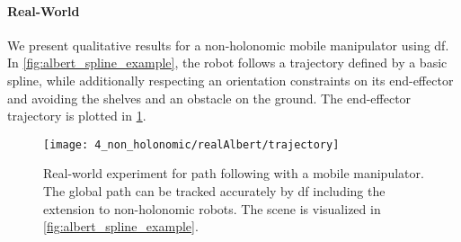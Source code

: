 \paragraph{Real-World}
We present qualitative results for a non\hyp{}holonomic mobile manipulator using \ac{df}.
In \cref{fig:albert_spline_example}, the robot follows a trajectory defined by a basic spline,
while additionally respecting an orientation constraints on its end-effector and avoiding
the shelves and an obstacle on the ground. The end-effector trajectory is plotted in \cref{fig:albert_spline_trajectory}.
%
\begin{figure}[t!]
    \centering
    \texttt{[image: 4\_non\_holonomic/realAlbert/trajectory]}
    \caption{Real-world experiment for path following with a mobile manipulator. The global path can be tracked
        accurately by \ac{df} including the extension to non\hyp{}holonomic robots. The scene 
        is visualized in \cref{fig:albert_spline_example}.}
    \label{fig:albert_spline_trajectory}
\end{figure}
%
\iffalse
%
\begin{figure}[ht]
  \centering
  \texttt{[image: 4\_non\_holonomic/realAlbert/motion\_in\_frame]}
  \caption{Trajectory following with mobile manipulator. \MS{This needs to be redone \ldots}}%
  \label{fig:albert_trajectory_following}
\end{figure}
%
\fi
